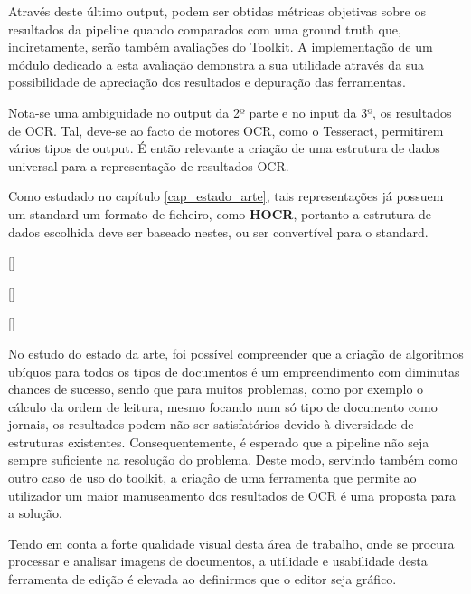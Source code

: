 Através deste último output, podem ser obtidas métricas objetivas sobre os resultados da pipeline quando comparados com uma \acrshort{ground truth} que, indiretamente, serão também avaliações do Toolkit. A implementação de um módulo dedicado a esta avaliação demonstra a sua utilidade através da sua possibilidade de apreciação dos resultados e depuração das ferramentas.

Nota-se uma ambiguidade no output da 2º parte e no input da 3º, os resultados de OCR. Tal, deve-se ao facto de motores OCR, como o Tesseract, permitirem vários tipos de output. É então relevante a criação de uma estrutura de dados universal para a representação de resultados OCR.

Como estudado no capítulo \ref{cap_estado_arte}, tais representações já possuem um standard um formato de ficheiro, como \textbf{HOCR}, portanto a estrutura de dados escolhida deve ser baseado nestes, ou ser convertível para o standard.


[\normalsize]

[\normalsize]

[\normalsize]


No estudo do estado da arte, foi possível compreender que a criação de algoritmos ubíquos para todos os tipos de documentos é um empreendimento com diminutas chances de sucesso, sendo que para muitos problemas, como por exemplo o cálculo da ordem de leitura, mesmo focando num só tipo de documento como jornais, os resultados podem não ser satisfatórios devido à diversidade de estruturas existentes. Consequentemente, é esperado que a pipeline não seja sempre suficiente na resolução do problema. 
Deste modo, servindo também como outro caso de uso do toolkit, a criação de uma ferramenta que permite ao utilizador um maior manuseamento dos resultados de OCR é uma proposta para a solução. 

Tendo em conta a forte qualidade visual desta área de trabalho, onde se procura processar e analisar imagens de documentos, a utilidade e usabilidade desta ferramenta de edição é elevada ao definirmos que o editor seja gráfico.

